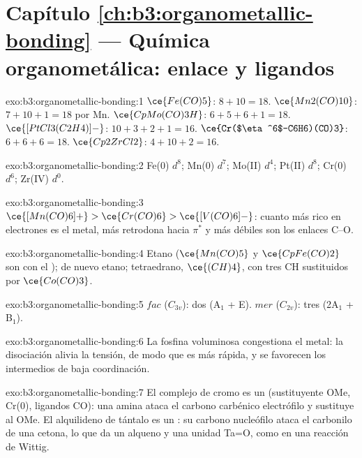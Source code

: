 \section*{Capítulo \ref{ch:b3:organometallic-bonding} --- Química organometálica: enlace y ligandos}

\begin{solution}{exo:b3:organometallic-bonding:1}
$\ce{Fe(CO)5}$: $8 + 10 = 18$. $\ce{Mn2(CO)10}$: $7 + 10 + 1 = 18$ por Mn. $\ce{CpMo(CO)3H}$: $6 + 5 + 6 + 1 =
18$. $\ce{[PtCl3(C2H4)]-}$: $10 + 3 + 2 + 1 = 16$. $\ce{Cr($\eta^6$-C6H6)(CO)3}$: $6 + 6 + 6 = 18$. $\ce{Cp2ZrCl2}$:
$4 + 10 + 2 = 16$.
\end{solution}

\begin{solution}{exo:b3:organometallic-bonding:2}
Fe(0) $d^8$; Mn(0) $d^7$; Mo(II) $d^4$; Pt(II) $d^8$; Cr(0) $d^6$; Zr(IV) $d^0$.
\end{solution}

\begin{solution}{exo:b3:organometallic-bonding:3}
$\ce{[Mn(CO)6]+} > \ce{Cr(CO)6} > \ce{[V(CO)6]-}$: cuanto más rico en electrones es el metal, más
retrodona hacia $\pi^*$ y más débiles son los enlaces C--O.
\end{solution}

\begin{solution}{exo:b3:organometallic-bonding:4}
Etano ($\ce{Mn(CO)5}$ y $\ce{CpFe(CO)2}$ son  con el ); de nuevo etano; tetraedrano,
$\ce{(CH)4}$, con tres CH sustituidos por $\ce{Co(CO)3}$.
\end{solution}

\begin{solution}{exo:b3:organometallic-bonding:5}
$fac$ ($C_{3v}$): dos (A$_1$ + E). $mer$ ($C_{2v}$): tres (2A$_1$ + B$_1$).
\end{solution}

\begin{solution}{exo:b3:organometallic-bonding:6}
La fosfina voluminosa congestiona el metal: la disociación alivia la tensión, de modo que es
más rápida, y se favorecen los intermedios de baja coordinación.
\end{solution}

\begin{solution}{exo:b3:organometallic-bonding:7}
El complejo de cromo es un  (sustituyente OMe, Cr(0), ligandos CO): una
amina ataca el carbono carbénico electrófilo y sustituye al OMe. El alquilideno de
tántalo es un : su carbono nucleófilo ataca el carbonilo de una
cetona, lo que da un alqueno y una unidad Ta=O, como en una reacción de Wittig.
\end{solution}

